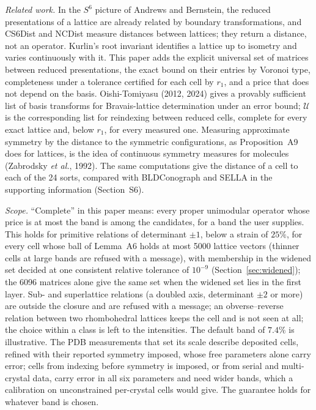 \emph{Related work.} In the $S^6$ picture of Andrews and Bernstein, the reduced presentations of a lattice are already related by boundary transformations, and CS6Dist and NCDist measure distances between lattices; they return a distance, not an operator. Kurlin's root invariant identifies a lattice up to isometry and varies continuously with it. This paper adds the explicit universal set of matrices between reduced presentations, the exact bound on their entries by Voronoi type, completeness under a tolerance certified for each cell by $r_1$, and a price that does not depend on the basis. Oishi-Tomiyasu (2012, 2024) gives a provably sufficient list of basis transforms for Bravais-lattice determination under an error bound; $\mathcal U$ is the corresponding list for reindexing between reduced cells, complete for every exact lattice and, below $r_1$, for every measured one. Measuring approximate symmetry by the distance to the symmetric configurations, as Proposition~A9 does for lattices, is the idea of continuous symmetry measures for molecules (Zabrodsky \emph{et al.}, 1992). The same computations give the distance of a cell to each of the 24 sorts, compared with BLDConograph and SELLA in the supporting information (Section~S6).

\emph{Scope.} ``Complete'' in this paper means: every proper unimodular operator whose price is at most the band is among the candidates, for a band the user supplies. This holds for primitive relations of determinant $\pm1$, below a strain of $25\%$, for every cell whose ball of Lemma~A6 holds at most 5000 lattice vectors (thinner cells at large bands are refused with a message), with membership in the widened set decided at one consistent relative tolerance of $10^{-9}$ (Section~\ref{sec:widened}); the 6096 matrices alone give the same set when the widened set lies in the first layer. Sub- and superlattice relations (a doubled axis, determinant $\pm2$ or more) are outside the closure and are refused with a message; an obverse--reverse relation between two rhombohedral lattices keeps the cell and is not seen at all; the choice within a class is left to the intensities. The default band of $7.4\%$ is illustrative. The PDB measurements that set its scale describe deposited cells, refined with their reported symmetry imposed, whose free parameters alone carry error; cells from indexing before symmetry is imposed, or from serial and multi-crystal data, carry error in all six parameters and need wider bands, which a calibration on unconstrained per-crystal cells would give. The guarantee holds for whatever band is chosen.


